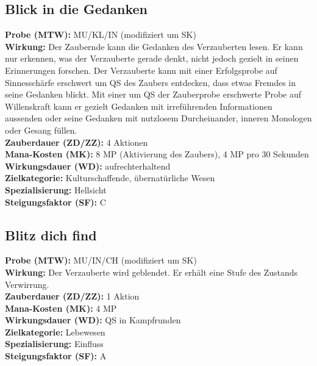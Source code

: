 \subsection{Blick in die Gedanken}
\label{chap:blick_in_die_gedanken}
\textbf{Probe (MTW):} MU/KL/IN (modifiziert um SK) \\
\textbf{Wirkung:} Der Zaubernde kann die Gedanken des Verzauberten lesen. Er kann nur erkennen, was der Verzauberte gerade denkt, nicht jedoch gezielt in seinen Erinnerungen forschen. Der Verzauberte kann mit einer Erfolgsprobe auf Sinnesschärfe erschwert um QS des Zaubers entdecken, dass etwas Fremdes in seine Gedanken blickt. Mit einer um QS der Zauberprobe erschwerte Probe auf Willenskraft kann er gezielt Gedanken mit irreführenden Informationen aussenden oder seine Gedanken mit nutzlosem Durcheinander, inneren Monologen oder Gesang füllen. \\
\textbf{Zauberdauer (ZD/ZZ):} 4 Aktionen \\
\textbf{Mana-Kosten (MK):} 8 MP (Aktivierung des Zaubers), 4 MP pro 30 Sekunden \\
\textbf{Wirkungsdauer (WD):} aufrechterhaltend \\
\textbf{Zielkategorie:} Kulturschaffende, übernatürliche Wesen \\
\textbf{Spezialisierung:} Hellsicht \\
\textbf{Steigungsfaktor (SF):} C


\subsection{Blitz dich find}
\label{chap:blitz_dich_find}
\textbf{Probe (MTW):} MU/IN/CH (modifiziert um SK) \\
\textbf{Wirkung:} Der Verzauberte wird geblendet. Er erhält eine Stufe des Zustands Verwirrung. \\
\textbf{Zauberdauer (ZD/ZZ):} 1 Aktion \\
\textbf{Mana-Kosten (MK):} 4 MP \\
\textbf{Wirkungsdauer (WD):} QS in Kampfrunden \\
\textbf{Zielkategorie:} Lebewesen \\
\textbf{Spezialisierung:} Einfluss \\
\textbf{Steigungsfaktor (SF):} A


